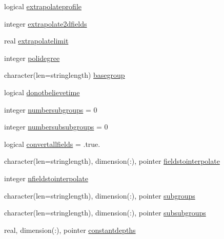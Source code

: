\begin{DoxyCompactItemize}
\item 
logical \mbox{\hyperlink{structmoduleinterpolategrids_1_1t__interpolategrids_a96d930a7b53cfe6a02e4c9c5d8289ae1}{extrapolateprofile}}
\item 
integer \mbox{\hyperlink{structmoduleinterpolategrids_1_1t__interpolategrids_af87d30c77e31de819caf9323fbe04ec0}{extrapolate2dfields}}
\item 
real \mbox{\hyperlink{structmoduleinterpolategrids_1_1t__interpolategrids_a652db268ff59fd3bb80b50091307571e}{extrapolatelimit}}
\item 
integer \mbox{\hyperlink{structmoduleinterpolategrids_1_1t__interpolategrids_afdfb2ead7ab8a1d189ba9dffc0a9343c}{polidegree}}
\item 
character(len=stringlength) \mbox{\hyperlink{structmoduleinterpolategrids_1_1t__interpolategrids_aa492c6cf66397c353f8f572f4eba84f7}{basegroup}}
\item 
logical \mbox{\hyperlink{structmoduleinterpolategrids_1_1t__interpolategrids_a3145c610d22826ed86dd0f39c91fbdd5}{donotbelievetime}}
\item 
integer \mbox{\hyperlink{structmoduleinterpolategrids_1_1t__interpolategrids_a54e3335f346fb6cb8e5e9d9602c05ea1}{numbersubgroups}} = 0
\item 
integer \mbox{\hyperlink{structmoduleinterpolategrids_1_1t__interpolategrids_ab51f9fa496f5d8cbfc2e123312a154a7}{numbersubsubgroups}} = 0
\item 
logical \mbox{\hyperlink{structmoduleinterpolategrids_1_1t__interpolategrids_a61e2270ff662e6bd867649a531bd7944}{convertallfields}} = .true.
\item 
character(len=stringlength), dimension(\+:), pointer \mbox{\hyperlink{structmoduleinterpolategrids_1_1t__interpolategrids_ae9b4f62c1a43354e5c4e08af0b178648}{fieldstointerpolate}}
\item 
integer \mbox{\hyperlink{structmoduleinterpolategrids_1_1t__interpolategrids_afd8435b6d0bd1fe99cf74e02585d60a6}{nfieldstointerpolate}}
\item 
character(len=stringlength), dimension(\+:), pointer \mbox{\hyperlink{structmoduleinterpolategrids_1_1t__interpolategrids_ad1fbf3132b365d548237916429d269c7}{subgroups}}
\item 
character(len=stringlength), dimension(\+:), pointer \mbox{\hyperlink{structmoduleinterpolategrids_1_1t__interpolategrids_a15bc86b7681b2516d20b7f3d023c3b8e}{subsubgroups}}
\item 
real, dimension(\+:), pointer \mbox{\hyperlink{structmoduleinterpolategrids_1_1t__interpolategrids_a3482d7c5f1b7987008191eb8b6e26616}{constantdepths}}

\end{DoxyCompactItemize}
